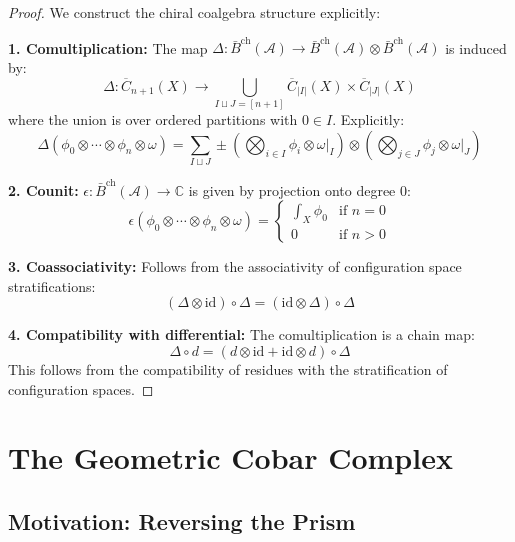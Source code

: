 \begin{proof}
We construct the chiral coalgebra structure explicitly:

\textbf{1. Comultiplication:} The map $\Delta: \bar{B}^{\text{ch}}(\mathcal{A}) \to \bar{B}^{\text{ch}}(\mathcal{A}) \otimes \bar{B}^{\text{ch}}(\mathcal{A})$ is induced by:
\[
\Delta: \overline{C}_{n+1}(X) \to \bigcup_{I \sqcup J = [n+1]} \overline{C}_{|I|}(X) \times \overline{C}_{|J|}(X)
\]
where the union is over ordered partitions with $0 \in I$. Explicitly:
\[
\Delta(\phi_0 \otimes \cdots \otimes \phi_n \otimes \omega) = \sum_{I \sqcup J} \pm \left(\bigotimes_{i \in I} \phi_i \otimes \omega|_I\right) \otimes \left(\bigotimes_{j \in J} \phi_j \otimes \omega|_J\right)
\]

\textbf{2. Counit:} $\epsilon: \bar{B}^{\text{ch}}(\mathcal{A}) \to \mathbb{C}$ is given by projection onto degree 0:
\[
\epsilon(\phi_0 \otimes \cdots \otimes \phi_n \otimes \omega) = \begin{cases}
\int_X \phi_0 & \text{if } n = 0 \\
0 & \text{if } n > 0
\end{cases}
\]

\textbf{3. Coassociativity:} Follows from the associativity of configuration space stratifications:
\[
(\Delta \otimes \text{id}) \circ \Delta = (\text{id} \otimes \Delta) \circ \Delta
\]

\textbf{4. Compatibility with differential:} The comultiplication is a chain map:
\[
\Delta \circ d = (d \otimes \text{id} + \text{id} \otimes d) \circ \Delta
\]
This follows from the compatibility of residues with the stratification of configuration spaces.
\end{proof}

\section{The Geometric Cobar Complex}

\subsection{Motivation: Reversing the Prism}

